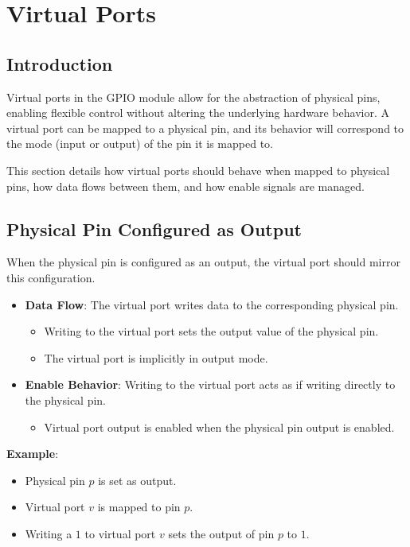 \section{Virtual Ports}

\subsection{Introduction}
Virtual ports in the GPIO module allow for the abstraction of physical pins, enabling flexible control without altering the underlying hardware behavior. A virtual port can be mapped to a physical pin, and its behavior will correspond to the mode (input or output) of the pin it is mapped to.

This section details how virtual ports should behave when mapped to physical pins, how data flows between them, and how enable signals are managed.

\subsection{Physical Pin Configured as Output}
When the physical pin is configured as an output, the virtual port should mirror this configuration.

\begin{itemize}[noitemsep]
    \item \textbf{Data Flow}: The virtual port writes data to the corresponding physical pin.
    \begin{itemize}[noitemsep]
        \item Writing to the virtual port sets the output value of the physical pin.
        \item The virtual port is implicitly in output mode.
    \end{itemize}
    \item \textbf{Enable Behavior}: Writing to the virtual port acts as if writing directly to the physical pin.
    \begin{itemize}[noitemsep]
        \item Virtual port output is enabled when the physical pin output is enabled.
    \end{itemize}
\end{itemize}

\textbf{Example}:
\begin{itemize}[noitemsep]
    \item Physical pin $p$ is set as output.
    \item Virtual port $v$ is mapped to pin $p$.
    \item Writing a $1$ to virtual port $v$ sets the output of pin $p$ to $1$.
\end{itemize}

